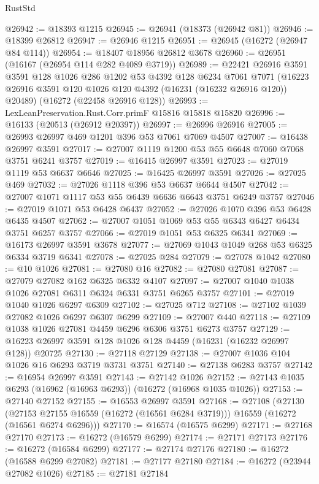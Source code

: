 \begin{lexlean}{RustStd}
\begin{coremodule}
@26942 := @18393 @1215
@26945 := @26941 (@18373 (@26942 @81))
@26946 := @18399 @26812
@26947 := @26946 @1215
@26951 := @26945 (@16272 (@26947 @84 @114))
@26954 := @18407 @18956 @26812 @3678
@26960 := @26951 (@16167 (@26954 @114 @282 @4089 @3719))
@26989 := @22421
    @26916
    @3591
    @3591
    @128
    @1026
    @286
    @1202
    @53
    @4392
    @128
    @6234
    @7061
    @7071
    (@16223 @26916 @3591 @120 @1026 @120 @4392 (@16231 (@16232 @26916 @120)) @20489)
    (@16272 (@22458 @26916 @128))
@26993 := LexLeanPreservation.Rust.Corr.primF @15816 @15818 @15820
@26996 := @16133 (@20513 (@26912 @20397))
@26997 := @26996 @26916
@27005 := @26993 @26997 @469 @1201 @396 @53 @7061 @7069 @4507
@27007 := @16438 @26997 @3591
@27017 := @27007 @1119 @1200 @53 @55 @6648 @7060 @7068 @3751 @6241 @3757
@27019 := @16415 @26997 @3591
@27023 := @27019 @1119 @53 @6637 @6646
@27025 := @16425 @26997 @3591
@27026 := @27025 @469
@27032 := @27026 @1118 @396 @53 @6637 @6644 @4507
@27042 := @27007 @1071 @1117 @53 @55 @6439 @6636 @6643 @3751 @6249 @3757
@27046 := @27019 @1071 @53 @6428 @6437
@27052 := @27026 @1070 @396 @53 @6428 @6435 @4507
@27062 := @27007 @1051 @1069 @53 @55 @6343 @6427 @6434 @3751 @6257 @3757
@27066 := @27019 @1051 @53 @6325 @6341
@27069 := @16173 @26997 @3591 @3678
@27077 := @27069 @1043 @1049 @268 @53 @6325 @6334 @3719 @6341
@27078 := @27025 @284
@27079 := @27078 @1042
@27080 := @10 @1026
@27081 := @27080 @16
@27082 := @27080 @27081
@27087 := @27079 @27082 @162 @6325 @6332 @4107
@27097 := @27007 @1040 @1038 @1026 @27081 @6311 @6324 @6331 @3751 @6265 @3757
@27101 := @27019 @1040 @1026 @6297 @6309
@27102 := @27025 @712
@27108 := @27102 @1039 @27082 @1026 @6297 @6307 @6299
@27109 := @27007 @440
@27118 := @27109 @1038 @1026 @27081 @4459 @6296 @6306 @3751 @6273 @3757
@27129 := @16223 @26997 @3591 @128 @1026 @128 @4459 (@16231 (@16232 @26997 @128)) @20725
@27130 := @27118 @27129
@27138 := @27007 @1036 @104 @1026 @16 @6293 @3719 @3731 @3751
@27140 := @27138 @6283 @3757
@27142 := @16954 @26997 @3591
@27143 := @27142 @1026
@27152 := @27143 @1035 @6293 (@16962 (@16963 @6293)) (@16272 (@16968 @1035 @1026))
@27153 := @27140 @27152
@27155 := @16553 @26997 @3591
@27168 := @27108
    (@27130
      (@27153 @27155 @16559 (@16272 (@16561 @6284 @3719)))
      @16559
      (@16272 (@16561 @6274 @6296)))
@27170 := @16574 (@16575 @6299)
@27171 := @27168 @27170
@27173 := @16272 (@16579 @6299)
@27174 := @27171 @27173
@27176 := @16272 (@16584 @6299)
@27177 := @27174 @27176
@27180 := @16272 (@16588 @6299 @27082)
@27181 := @27177 @27180
@27184 := @16272 (@23944 @27082 @1026)
@27185 := @27181 @27184

\end{coremodule}
\end{lexlean}
